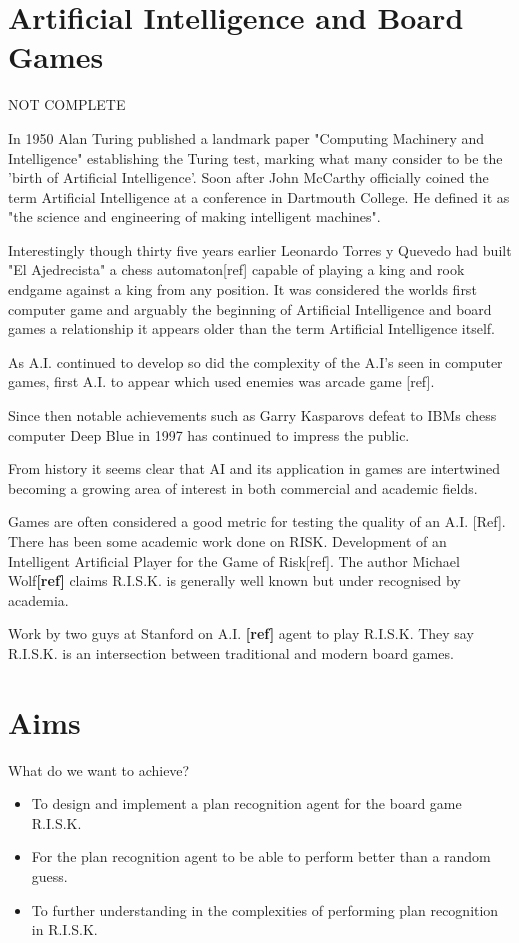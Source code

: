 \documentclass[parskip]{cs4rep}
\begin{document}
\section{Artificial Intelligence and Board Games}

NOT COMPLETE

In 1950 Alan Turing published a landmark paper "Computing Machinery and Intelligence" establishing the Turing test, marking what many consider to be the 'birth of Artificial Intelligence'. Soon after John McCarthy officially coined the term Artificial Intelligence at a conference in Dartmouth College. He defined it as "the science and engineering of making intelligent machines".

Interestingly though thirty five years earlier Leonardo Torres y Quevedo had built "El Ajedrecista" a chess automaton[ref] capable of playing a king and rook endgame against a king from any position. It was considered the worlds first computer game and arguably the beginning of Artificial Intelligence and board games a relationship it appears older than the term Artificial Intelligence itself. 

As A.I. continued to develop so did the complexity of the A.I's seen in computer games, first A.I. to appear which used enemies was arcade game [ref].

Since then notable achievements such as Garry Kasparovs defeat to IBMs chess computer Deep Blue in 1997 has continued to impress the public. 

From history it seems clear that AI and its application in games are intertwined becoming a growing area of interest in both commercial and academic fields.

Games are often considered a good metric for testing the quality of an A.I. [Ref]. There has been some academic work done on RISK. Development of an Intelligent Artificial Player for the Game of Risk[ref]. The author Michael Wolf\textbf{[ref]} claims R.I.S.K. is generally well known but under recognised by academia.

Work by two guys at Stanford on A.I. \textbf{[ref]} agent to play R.I.S.K. They say R.I.S.K. is an intersection between traditional and modern board games.

\section{Aims}

What do we want to achieve?

\begin{itemize}
\item
To design and implement a plan recognition agent for the board game R.I.S.K.
\item
For the plan recognition agent to be able to perform better than a random guess.
\item
To further understanding in the complexities of performing plan recognition in R.I.S.K.
\end{itemize}
\end{document}
